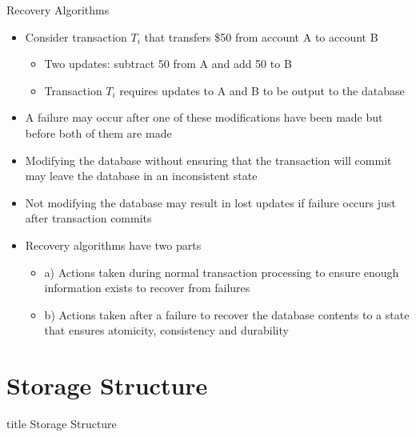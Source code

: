 \documentclass[aspectratio=169, xcolor=dvipsnames]{beamer}
\begin{document}
\begin{frame}{Recovery Algorithms}
    \begin{itemize}[<+->]
        \item Consider transaction $T_i$ that transfers \$50 from account A to account B
        \begin{itemize}
            \item[$\triangleright$] Two updates: subtract 50 from A and add 50 to B
            \item[$\triangleright$] Transaction $T_i$ requires updates to A and B to be output to the database
        \end{itemize}
        \item A failure may occur after one of these modifications have been made but before both of them are made
        \item Modifying the database without ensuring that the transaction will commit may leave the database in an inconsistent state
        \item Not modifying the database may result in lost updates if failure occurs just after transaction commits
        \item Recovery algorithms have two parts
        \begin{itemize}
            \item[$\triangleright$] a) Actions taken during normal transaction processing to ensure enough information exists to recover from failures
            \item[$\triangleright$] b) Actions taken after a failure to recover the database contents to a state that ensures atomicity, consistency and durability
        \end{itemize}
    \end{itemize}
\end{frame}

\section{Storage Structure}

\begin{frame}
  \vfill
  \centering
  \begin{beamercolorbox}[sep=8pt,center,shadow=true,rounded=true]{title}
    Storage Structure\par%
  \end{beamercolorbox}
  \vfill
\end{frame}
\end{document}
